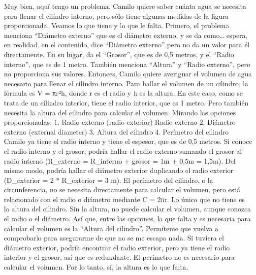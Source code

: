 \documentclass[
]{article}
\begin{document}
Muy bien, aquí tengo un problema. Camilo quiere saber cuánta agua se
necesita para llenar el cilindro interno, pero sólo tiene algunas
medidas de la figura proporcionada. Veamos lo que tiene y lo que le
falta. Primero, el problema menciona ``Diámetro externo'' que es el
diámetro externo, y se da como\ldots{} espera, en realidad, en el
contenido, dice ``Diámetro externo'' pero no da un valor para él
directamente. En su lugar, da el ``Grosor'', que es de 0,5 metros, y el
``Radio interno'', que es de 1 metro. También menciona ``Altura'' y
``Radio externo'', pero no proporciona sus valores. Entonces, Camilo
quiere averiguar el volumen de agua necesario para llenar el cilindro
interno. Para hallar el volumen de un cilindro, la fórmula es V = πr²h,
donde r es el radio y h es la altura. En este caso, como se trata de un
cilindro interior, tiene el radio interior, que es 1 metro. Pero también
necesita la altura del cilindro para calcular el volumen. Mirando las
opciones proporcionadas: 1. Radio externo (radio exterior) Radio externo
2. Diámetro externo (external diameter) 3. Altura del cilindro 4.
Perímetro del cilindro Camilo ya tiene el radio interno y tiene el
espesor, que es de 0,5 metros. Si conoce el radio interno y el grosor,
podría hallar el radio externo sumando el grosor al radio interno
(R\_externo = R\_interno + grosor = 1m + 0,5m = 1,5m). Del mismo modo,
podría hallar el diámetro exterior duplicando el radio exterior
(D\_exterior = 2 * R\_exterior = 3 m). El perímetro del cilindro, o la
circunferencia, no se necesita directamente para calcular el volumen,
pero está relacionado con el radio o diámetro mediante C = 2πr. Lo único
que no tiene es la altura del cilindro. Sin la altura, no puede calcular
el volumen, aunque conozca el radio o el diámetro. Así que, entre las
opciones, la que falta y es necesaria para calcular el volumen es la
``Altura del cilindro''. Permíteme que vuelva a comprobarlo para
asegurarme de que no se me escapa nada. Si tuviera el diámetro exterior,
podría encontrar el radio exterior, pero ya tiene el radio interior y el
grosor, así que es redundante. El perímetro no es necesario para
calcular el volumen. Por lo tanto, sí, la altura es lo que falta.
\end{document}
